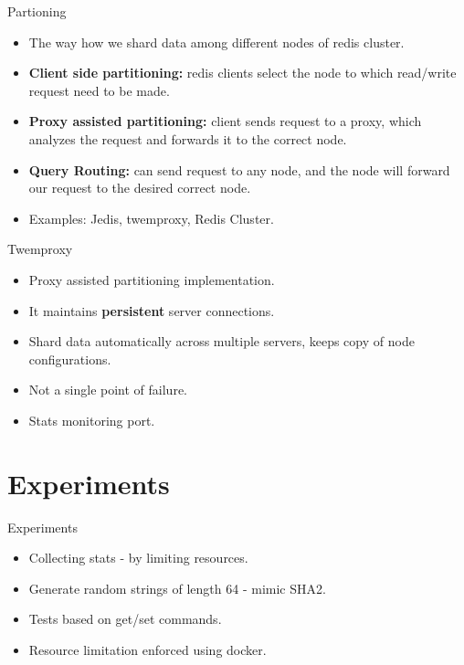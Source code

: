 \documentclass{beamer}
\begin{document}
\begin{frame}{Partioning}
\begin{itemize}
    \item The way how we shard data among different nodes of redis cluster.
    \item \textbf{Client side partitioning:} redis clients select the node to which read/write request need to be made.
    \item \textbf{Proxy assisted partitioning:} client sends request to a proxy,
        which analyzes the request and forwards it to the correct node.
    \item \textbf{Query Routing:} can send request to any node, and the node
        will forward our request to the desired correct node.
    \item Examples: Jedis, twemproxy, Redis Cluster. 
\end{itemize}
\end{frame}

\begin{frame}{Twemproxy}
\begin{itemize}
    \item Proxy assisted partitioning implementation.
    \item It maintains \textbf{persistent} server connections.
    \item Shard data automatically across multiple servers, keeps copy of node configurations.
    \item Not a single point of failure.
    \item Stats monitoring port.
\end{itemize}
\end{frame}

\section{Experiments}

\begin{frame}{Experiments}
\begin{itemize}
    \item Collecting stats - by limiting resources.
    \item Generate random strings of length 64 - mimic SHA2.
    \item Tests based on get/set commands.
    \item Resource limitation enforced using docker.
\end{itemize}
\end{frame}
\end{document}
